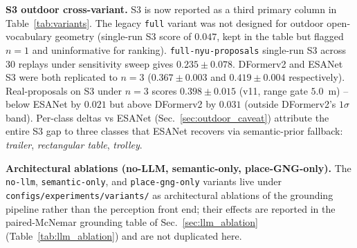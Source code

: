 \noindent\textbf{S3 outdoor cross-variant.}
S3 is now reported as a third primary column in
Table~\ref{tab:variants}. The legacy \texttt{full} variant was
not designed for outdoor open-vocabulary geometry (single-run S3
score of $0.047$, kept in the table but flagged $n{=}1$ and
uninformative for ranking). \texttt{full-nyu-proposals}
single-run S3 across $30$ replays under sensitivity sweep gives
$0.235 \pm 0.078$. DFormerv2 and ESANet S3 were both replicated to $n{=}3$
($0.367 \pm 0.003$ and $0.419 \pm 0.004$ respectively).
Real-proposals on S3 under $n{=}3$ scores $0.398 \pm 0.015$
(v11, range gate $5.0$~m) -- below ESANet by $0.021$ but above
DFormerv2 by $0.031$ (outside DFormerv2's $1\sigma$ band). Per-class deltas vs ESANet
(Sec.~\ref{sec:outdoor_caveat}) attribute the entire S3 gap to
three classes that ESANet recovers via semantic-prior fallback:
\textit{trailer}, \textit{rectangular table}, \textit{trolley}.

\noindent\textbf{Architectural ablations (no-LLM, semantic-only,
place-GNG-only).}
The \texttt{no-llm}, \texttt{semantic-only}, and
\texttt{place-gng-only} variants live under
\texttt{configs/experiments/variants/} as architectural ablations
of the grounding pipeline rather than the perception front end;
their effects are reported in the paired-McNemar grounding table
of Sec.~\ref{sec:llm_ablation} (Table~\ref{tab:llm_ablation}) and
are not duplicated here.


